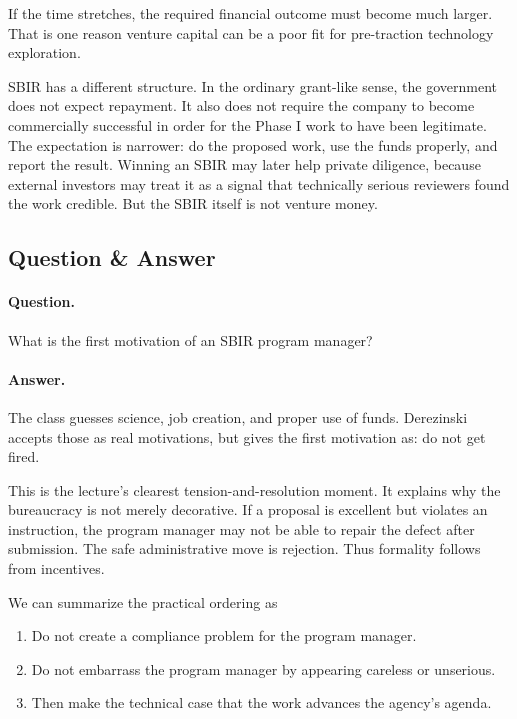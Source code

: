 If the time stretches, the required financial outcome must become much larger. That is one reason venture capital can be a poor fit for pre-traction technology exploration.

SBIR has a different structure. In the ordinary grant-like sense, the government does not expect repayment. It also does not require the company to become commercially successful in order for the Phase I work to have been legitimate. The expectation is narrower: do the proposed work, use the funds properly, and report the result. Winning an SBIR may later help private diligence, because external investors may treat it as a signal that technically serious reviewers found the work credible. But the SBIR itself is not venture money.

\subsection{Question \& Answer}

\paragraph{Question.}
What is the first motivation of an SBIR program manager?

\paragraph{Answer.}
The class guesses science, job creation, and proper use of funds. Derezinski accepts those as real motivations, but gives the first motivation as: do not get fired.

This is the lecture's clearest tension-and-resolution moment. It explains why the bureaucracy is not merely decorative. If a proposal is excellent but violates an instruction, the program manager may not be able to repair the defect after submission. The safe administrative move is rejection. Thus formality follows from incentives.

We can summarize the practical ordering as

\begin{enumerate}
\item Do not create a compliance problem for the program manager.
\item Do not embarrass the program manager by appearing careless or unserious.
\item Then make the technical case that the work advances the agency's agenda.
\end{enumerate}

